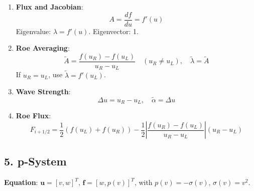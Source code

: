 \documentclass[12pt]{article}
\begin{document}
\begin{enumerate}
    \item \textbf{Flux and Jacobian}:
    \[
    A = \frac{df}{du} = f'(u)
    \]
    Eigenvalue: \(\lambda = f'(u)\). Eigenvector: 1.

    \item \textbf{Roe Averaging}:
    \[
    \tilde{A} = \frac{f(u_R) - f(u_L)}{u_R - u_L} \quad (u_R \neq u_L), \quad \tilde{\lambda} = \tilde{A}
    \]
    If \( u_R = u_L \), use \(\tilde{\lambda} = f'(u_L)\).

    \item \textbf{Wave Strength}:
    \[
    \Delta u = u_R - u_L, \quad \tilde{\alpha} = \Delta u
    \]

    \item \textbf{Roe Flux}:
    \[
    F_{i+1/2} = \frac{1}{2} \left( f(u_L) + f(u_R) \right) - \frac{1}{2} \left| \frac{f(u_R) - f(u_L)}{u_R - u_L} \right| (u_R - u_L)
    \]
\end{enumerate}

\subsection*{5. p-System}
\textbf{Equation}: \(\mathbf{u} = [v, w]^T\), \(\mathbf{f} = [w, p(v)]^T\), with \( p(v) = -\sigma(v) \), \(\sigma(v) = v^2\).
\end{document}
